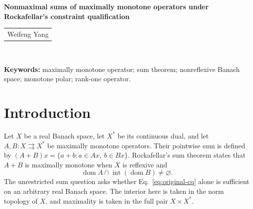 \documentclass[11pt]{article}
\newcommand{\dom}{\operatorname{dom}}
\theoremstyle{definition}
\theoremstyle{remark}
\begin{document}
\begin{center}
{\Large\bfseries Nonmaximal sums of maximally monotone operators under Rockafellar’s constraint qualification}\\[10pt]
\begin{tabular}{c}
Weifeng Yang\footnotemark
\end{tabular}\\[10pt]
\end{center}


\begin{abstract}

We construct counterexamples to Rockafellar's sum conjecture in which
two maximally monotone operators satisfy the interior-domain condition
but their sum is not maximally monotone. The examples are defined on
$c_0$ and standard $\ell^1$, with one summand a bounded positive rank-one
operator defined on the whole space. We establish a general construction
theorem that computes the entire monotone polar of a class of graphs,
gives a necessary and sufficient condition for their maximal monotonicity,
and shows how a positive rank-one perturbation produces a nonmaximal sum
under this condition. We apply this theorem to construct the counterexample
on $c_0$ by coupling triangular operators with a Lipschitz curve. A bounded linear surjection then transfers the construction to standard $\ell^1$. 

\end{abstract}

\noindent\textbf{Keywords:} maximally monotone operator; sum theorem;
nonreflexive Banach space; monotone polar; rank-one operator. 

\section{Introduction}
\label{sec:introduction}
Let $X$ be a real Banach space, let $X^*$ be its continuous dual, and let
$A,B:X\rightrightarrows X^*$ be maximally monotone operators. Their pointwise
sum is defined by $(A+B)x=\{a+b:a\in Ax,\ b\in Bx\}$. Rockafellar's sum
theorem \cite{rockafellar1970} states that $A+B$ is maximally monotone when
$X$ is reflexive and
\begin{equation}
\dom A\cap\operatorname{int}(\dom B)\ne\varnothing.
\label{eq:original-cq}
\end{equation}
The unrestricted sum question asks whether Eq.~\eqref{eq:original-cq}
alone is sufficient on an arbitrary real Banach space. The interior here
is taken in the norm topology of $X$, and maximality is taken in the full
pair $X\times X^*$. 
\end{document}
